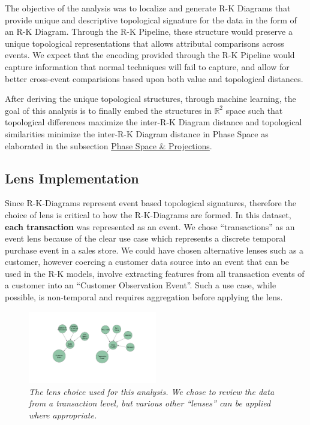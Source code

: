 The objective of the analysis was to localize and generate R-K Diagrams that provide unique and descriptive topological signature for the data in the form of an R-K Diagram. Through the R-K Pipeline, these structure would preserve a unique topological representations that allows attributal comparisons across events. We expect that the encoding provided through the R-K Pipeline would capture information that normal techniques will fail to capture, and allow for better cross-event comparisions based upon both value and topological distances.

After deriving the unique topological structures, through machine learning, the goal of this analysis is to finally embed the structures in $\mathbb{R}^{2}$ space such that topological differences maximize the inter-R-K Diagram distance and topological similarities minimize the inter-R-K Diagram distance in Phase Space as elaborated in the subsection \hyperref[subsec:phase_space]{Phase Space \& Projections}.

\subsection{Lens Implementation}
Since R-K-Diagrams represent event based topological signatures, therefore the choice of lens is critical to how the R-K-Diagrams are formed. In this dataset, \textbf{each transaction} was represented as an event. We chose ``transactions'' as an event lens because of the clear use case which represents a discrete temporal purchase event in a sales store. We could have chosen alternative lenses such as a customer, however coercing a customer data source into an event that can be used in the R-K models, involve extracting features from all transaction events of a customer into an ``Customer Observation Event''. Such a use case, while possible, is non-temporal and requires aggregation before applying the lens.

\begin{figure}[H]
    \centering
            \includegraphics[width=0.5\textwidth]{images/lens_choice.png}
    \caption{\textit{The lens choice used for this analysis. We chose to review the data from a transaction level, but various other ``lenses'' can be applied where appropriate.}}
    \label{fig:lens_choise}
\end{figure}

